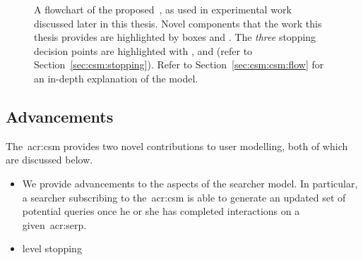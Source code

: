 \begin{figure}[t!]
    \centering
    \caption[Flowchart of the~]{A flowchart of the proposed~, as used in experimental work discussed later in this thesis. Novel components that the work this thesis provides are highlighted by boxes  and . The \emph{three} stopping decision points are highlighted with ,  and  (refer to Section~\ref{sec:csm:stopping}). Refer to Section~\ref{sec:csm:csm:flow} for an in-depth explanation of the model.}
    \label{fig:csm}
\end{figure}

\subsection{Advancements}\label{sec:csm:csm:advancements}
The~\gls{acr:csm} provides two novel contributions to user modelling, both of which are discussed below.

\begin{itemize}
    \item{We provide advancements to the  aspects of the searcher model. In particular, a searcher subscribing to the~\gls{acr:csm} is able to generate an updated set of potential queries once he or she has completed interactions on a given~\gls{acr:serp}.}
    \item{ level stopping}
    
\end{itemize}


